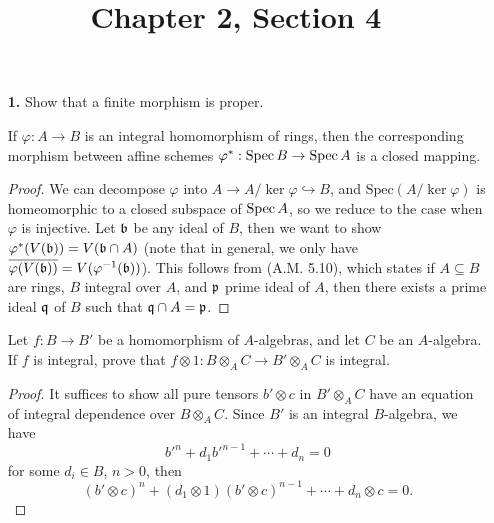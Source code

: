 \documentclass{article}
\title{Chapter 2, Section 4}
\begin{document}
\maketitle
\begin{enumerate} [label=\textbf{\arabic*.}, leftmargin=0em]

\item[\textbf{1.}] Show that a finite morphism is proper.

\begin{lemma}
    If $\varphi : A \to B$ is an integral homomorphism of rings, then the corresponding morphism between affine schemes $\varphi^* : \operatorname{Spec}{B} \to \operatorname{Spec}{A}$ is a closed mapping. 
\end{lemma}

\begin{proof}
    We can decompose $\varphi$ into $A \to A / \ker{\varphi} \hookrightarrow B$, and $\text{Spec}(A / \ker{\varphi})$ is homeomorphic to a closed subspace of $\operatorname{Spec}{A}$, so we reduce to the case when $\varphi$ is injective. Let $\mathfrak{b}$ be any ideal of $B$, then we want to show $\varphi^*(V(\mathfrak{b})) = V(\mathfrak{b} \cap A)$ (note that in general, we only have $\overline{\varphi(V(\mathfrak{b}))} = V(\varphi^{-1}(\mathfrak{b}))$). This follows from (A.M. 5.10), which states if $A \subseteq B$ are rings, $B$ integral over $A$, and $\mathfrak{p}$ prime ideal of $A$, then there exists a prime ideal $\mathfrak{q}$ of $B$ such that $\mathfrak{q} \cap A = \mathfrak{p}$.
\end{proof}

\begin{lemma}
    Let $f : B \to B'$ be a homomorphism of $A$-algebras, and let $C$ be an $A$-algebra. If $f$ is integral, prove that $f \otimes 1 : B \otimes_A C \to B' \otimes_A C$ is integral.
\end{lemma}

\begin{proof}
    It suffices to show all pure tensors $b'\otimes c$ in $B'\otimes_A C$ have an equation of integral dependence over $B\otimes_A C$. Since $B'$ is an integral $B$-algebra, we have $$b'^n + d_1 b'^{n - 1} + \cdots + d_n = 0$$ for some $d_i \in B$, $n > 0$, then 
    \begin{equation*}
        (b' \otimes c)^n + (d_1 \otimes 1)(b' \otimes c)^{n - 1} + \cdots + d_n \otimes c = 0.
    \end{equation*}
\end{proof}


\end{enumerate}
\end{document}
